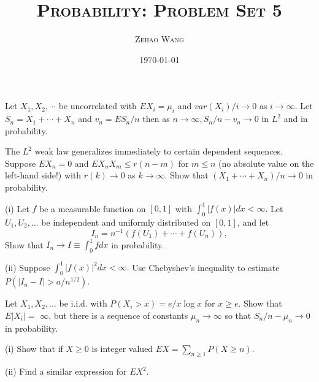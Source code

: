 \documentclass[en, normal, 11pt, black]{elegantnote}
\title{\textsc{Probability: Problem Set 5}}
\author{\textsc{Zehao Wang}}
\date{\today}
\newenvironment{exercise}[1]{\begin{tcolorbox}[colback=black!15, colframe=black!80, breakable, title=#1]}{\end{tcolorbox}}
\begin{document}
    \maketitle
    \begin{exercise}{2.2.1}
        Let $X_{1}, X_{2}, \cdots$ be uncorrelated with $E X_{i}=\mu_{i}$ and $var\left(X_{i}\right) / i \rightarrow 0$ as $i \rightarrow \infty$. Let $S_{n}=X_{1}+\cdots+X_{n}$ and $v_{n}=E S_{n} / n$ then as $n \rightarrow \infty, S_{n} / n-v_{n} \rightarrow 0$ in $L^{2}$ and in probability. 
    \end{exercise}

    \begin{exercise}{2.2.2}
        The $L^{2}$ weak law generalizes immediately to certain dependent sequences. Suppose $E X_{n}=0$ and $E X_{n} X_{m} \leq r(n-m)$ for $m \leq n$ (no absolute value on the left-hand side!) with $r(k) \rightarrow 0$ as $k \rightarrow \infty$. Show that $\left(X_{1}+\cdots+X_{n}\right) / n \rightarrow 0$ in probability. 
    \end{exercise}

    \begin{exercise}{2.2.3. Monte Carlo integration. }
        (i) Let $f$ be a measurable function on $[0,1]$ with $\int_{0}^{1}|f(x)| d x<\infty .$ Let $U_{1}, U_{2}, \ldots$ be independent and uniformly distributed on $[0,1]$, and let
        \[
            I_{n}=n^{-1}\left(f\left(U_{1}\right)+\cdots+f\left(U_{n}\right)\right), 
        \]
        Show that $I_{n} \rightarrow I \equiv \int_{0}^{1} f d x$ in probability. 
        
        (ii) Suppose $\int_{0}^{1}|f(x)|^{2} d x<\infty .$ Use Chebyshev's inequality to estimate $P\left(\left|I_{n}-I\right|>a / n^{1 / 2}\right)$. 
    \end{exercise}

    \begin{exercise}{2.2.5}
        Let $X_{1}, X_{2}, \ldots$ be i.i.d. with $P\left(X_{i}>x\right)=e / x \log x$ for $x \geq e$. Show that $E\left|X_{i}\right|=$ $\infty$, but there is a sequence of constants $\mu_{n} \rightarrow \infty$ so that $S_{n} / n-\mu_{n} \rightarrow 0$ in probability. 
    \end{exercise}

    \begin{exercise}{2.2.6}
        (i) Show that if $X \geq 0$ is integer valued $E X=\sum_{n \geq 1} P(X \geq n)$. 
        
        (ii) Find a similar expression for $E X^{2}$. 
    \end{exercise}
\end{document}
